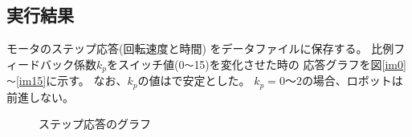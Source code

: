 \subsection{実行結果}
モータのステップ応答(回転速度と時間)
をデータファイルに保存する。
比例フィードバック係数$k_p$をスイッチ値(0\verb|～|15)を変化させた時の
応答グラフを図\ref{im0}\verb|～|\ref{im15}に示す。
なお、$k_p$の値はで安定とした。
$k_p = 0 ～ 2$の場合、ロボットは前進しない。
\begin{figure}[H]
  \begin{center}
  \caption{ステップ応答のグラフ}
  \end{center}
\end{figure}

